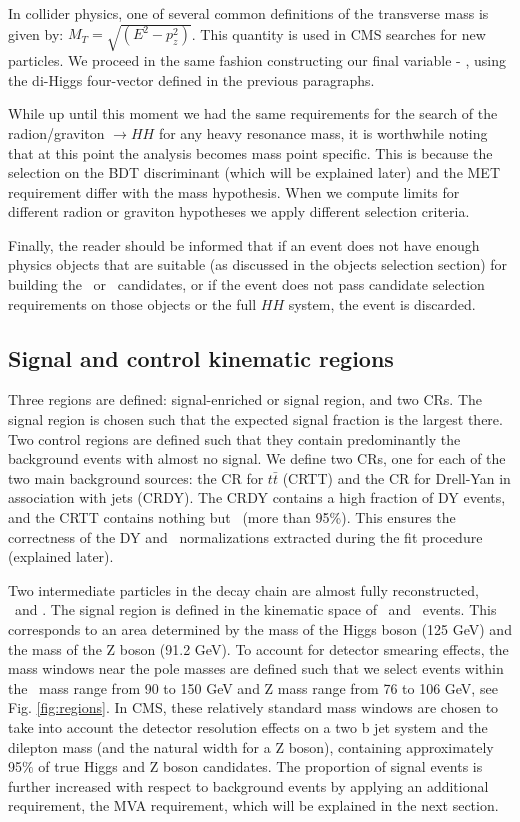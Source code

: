 In collider physics, one of several common definitions of the transverse mass is given by: $M_T=\sqrt{( E^2- p_z^2)}$. This quantity is  used in CMS searches for new particles. We proceed in the same fashion constructing our final variable - \mTHH, using the di-Higgs four-vector defined in the previous paragraphs. 

While up until this moment we had the same requirements for the search of the radion/graviton $\to HH$ for any heavy resonance mass, it is worthwhile noting that at this point the analysis becomes mass point specific. This is because the selection on the BDT discriminant (which will be explained later) and the MET requirement differ with the mass hypothesis. When we compute limits for different radion or graviton hypotheses we apply different selection criteria. 

Finally, the reader should be informed that if an event does not have enough physics objects that are suitable (as discussed in the objects selection section) for building the \Zll~or \HBB~candidates, or if the event does not pass candidate selection requirements on those objects or the full $HH$ system, the event is discarded.

\subsection{Signal and control kinematic regions}

Three regions are defined: signal-enriched or signal region, and two CRs. The signal region is chosen such that the expected signal fraction is the largest there. Two control regions are defined such that they contain predominantly the background events with almost no signal. We define two CRs, one for each of the two main background sources: the CR for $t\bar{t}$ (CRTT) and the CR for Drell-Yan in association with jets (CRDY). The CRDY contains a high fraction of DY events, and the CRTT contains nothing but \ttbar~(more than 95\%). This ensures the correctness of the DY and \ttbar~normalizations extracted during the fit procedure (explained later).

Two intermediate particles in the decay chain are almost fully reconstructed, \HBB~and \Zll. The signal region is defined in the kinematic space of \HBB~and \Zll~events. This corresponds to an area determined by the mass of the Higgs boson (125 GeV) and the mass of the Z boson (91.2 GeV). To account for detector smearing effects, the mass windows near the pole masses are defined such that we select events within the \HBB~mass range from 90 to 150 GeV and Z mass range from 76 to 106 GeV, see Fig. \ref{fig:regions}. In  CMS, these relatively standard mass windows are chosen to take into account the detector resolution effects on a two b jet system and the dilepton mass (and the natural width for a Z boson), containing approximately 95$\%$ of true Higgs and Z boson candidates. The proportion of signal events is further increased with respect to background events by applying an additional requirement, the MVA requirement, which will be explained in the next section.

